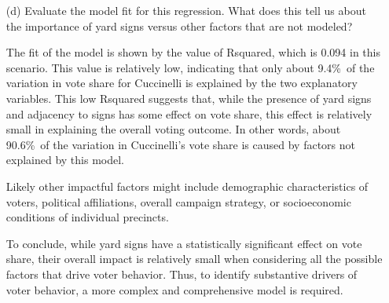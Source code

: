 \documentclass[12pt,letterpaper]{article}
\begin{document}
\begin{enumerate}
	\item [(d)] Evaluate the model fit for this regression.  What does this	tell us about the importance of yard signs versus other factors that are not modeled?

The fit of the model is shown by the value of Rsquared, which is 0.094 in this scenario. This value is relatively low, indicating that only about 9.4\%\ of the variation in vote share for Cuccinelli is explained by the two explanatory variables. This low Rsquared suggests that, while the presence of yard signs and adjacency to signs has some effect on vote share, this effect is relatively small in explaining the overall voting outcome. In other words, about 90.6\%\ of the variation in Cuccinelli’s vote share is caused by factors not explained by this model.

Likely other impactful factors might include demographic characteristics of voters, political affiliations, overall campaign strategy, or socioeconomic conditions of individual precincts.

To conclude, while yard signs have a statistically significant effect on vote share, their overall impact is relatively small when considering all the possible factors that drive voter behavior. Thus, to identify substantive drivers of voter behavior, a more complex and comprehensive model is required.
\end{enumerate}  
\end{document}
